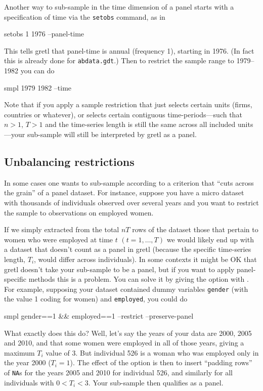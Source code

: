 Another way to sub-sample in the time dimension of a panel starts with
a specification of time via the \texttt{setobs} command, as in
\begin{code}
setobs 1 1976 --panel-time
\end{code}
This tells gretl that panel-time is annual (frequency 1), starting in
1976. (In fact this is already done for \texttt{abdata.gdt}.) Then
to restrict the sample range to 1979--1982 you can do
\begin{code}
smpl 1979 1982 --time
\end{code}

Note that if you apply a sample restriction that just selects certain
units (firms, countries or whatever), or selects certain contiguous
time-periods---such that $n>1$, $T>1$ and the time-series length is
still the same across all included units---your sub-sample will still
be interpreted by gretl as a panel.

\subsection{Unbalancing restrictions}

In some cases one wants to sub-sample according to a criterion that
``cuts across the grain'' of a panel dataset. For instance, suppose you
have a micro dataset with thousands of individuals observed over
several years and you want to restrict the sample to observations on
employed women.  

If we simply extracted from the total $nT$ rows of the dataset those
that pertain to women who were employed at time $t$ $(t = 1,\dots,T)$
we would likely end up with a dataset that doesn't count as a panel in
gretl (because the specific time-series length, $T_i$, would differ
across individuals). In some contexts it might be OK that gretl
doesn't take your sub-sample to be a panel, but if you want to apply
panel-specific methods this is a problem. You can solve it by giving
the  option with . For example, supposing
your dataset contained dummy variables \texttt{gender} (with the value
1 coding for women) and \texttt{employed}, you could do
%
\begin{code}
smpl gender==1 && employed==1 --restrict --preserve-panel
\end{code}
%
What exactly does this do? Well, let's say the years of your data are
2000, 2005 and 2010, and that some women were employed in all of those
years, giving a maximum $T_i$ value of 3. But individual 526 is a
woman who was employed only in the year 2000 ($T_i = 1$). The effect
of the  option is then to insert ``padding rows'' of
\texttt{NA}s for the years 2005 and 2010 for individual 526, and
similarly for all individuals with $0 < T_i < 3$. Your sub-sample
then qualifies as a panel.

